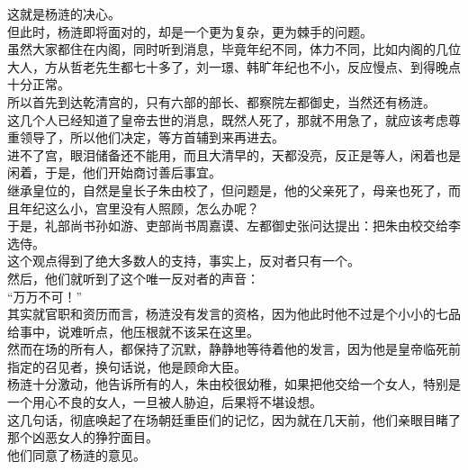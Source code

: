 \begin{multicols}{\theparacolNo}
这就是杨涟的决心。\\

但此时，杨涟即将面对的，却是一个更为复杂，更为棘手的问题。\\

虽然大家都住在内阁，同时听到消息，毕竟年纪不同，体力不同，比如内阁的几位大人，方从哲老先生都七十多了，刘一璟、韩旷年纪也不小，反应慢点、到得晚点十分正常。\\

所以首先到达乾清宫的，只有六部的部长、都察院左都御史，当然还有杨涟。\\

这几个人已经知道了皇帝去世的消息，既然人死了，那就不用急了，就应该考虑尊重领导了，所以他们决定，等方首辅到来再进去。\\

进不了宫，眼泪储备还不能用，而且大清早的，天都没亮，反正是等人，闲着也是闲着，于是，他们开始商讨善后事宜。\\

继承皇位的，自然是皇长子朱由校了，但问题是，他的父亲死了，母亲也死了，而且年纪这么小，宫里没有人照顾，怎么办呢？\\

于是，礼部尚书孙如游、吏部尚书周嘉谟、左都御史张问达提出：把朱由校交给李选侍。\\

这个观点得到了绝大多数人的支持，事实上，反对者只有一个。\\

然后，他们就听到了这个唯一反对者的声音：\\

“万万不可！”\\

其实就官职和资历而言，杨涟没有发言的资格，因为他此时他不过是个小小的七品给事中，说难听点，他压根就不该呆在这里。\\

然而在场的所有人，都保持了沉默，静静地等待着他的发言，因为他是皇帝临死前指定的召见者，换句话说，他是顾命大臣。\\

杨涟十分激动，他告诉所有的人，朱由校很幼稚，如果把他交给一个女人，特别是一个用心不良的女人，一旦被人胁迫，后果将不堪设想。\\

这几句话，彻底唤起了在场朝廷重臣们的记忆，因为就在几天前，他们亲眼目睹了那个凶恶女人的狰狞面目。\\

他们同意了杨涟的意见。\\


\end{multicols}
